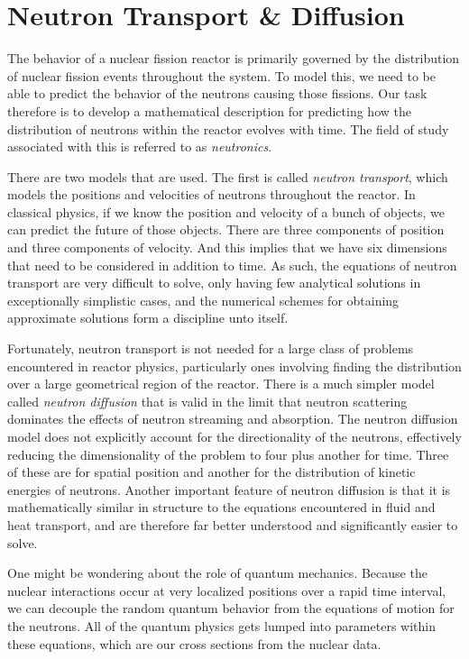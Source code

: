 \chapter{Neutron Transport \& Diffusion}

The behavior of a nuclear fission reactor is primarily governed by the distribution of nuclear fission events throughout the system. To model this, we need to be able to predict the behavior of the neutrons causing those fissions. Our task therefore is to develop a mathematical description for predicting how the distribution of neutrons within the reactor evolves with time. The field of study associated with this is referred to as \emph{neutronics}. 

There are two models that are used. The first is called \emph{neutron transport}, which models the positions and velocities of neutrons throughout the reactor. In classical physics, if we know the position and velocity of a bunch of objects, we can predict the future of those objects. There are three components of position and three components of velocity. And this implies that we have six dimensions that need to be considered in addition to time. As such, the equations of neutron transport are very difficult to solve, only having few analytical solutions in exceptionally simplistic cases, and the numerical schemes for obtaining approximate solutions form a discipline unto itself. 

Fortunately, neutron transport is not needed for a large class of problems encountered in reactor physics, particularly ones involving finding the distribution over a large geometrical region of the reactor. There is a much simpler model called \emph{neutron diffusion} that is valid in the limit that neutron scattering dominates the effects of neutron streaming and absorption. The neutron diffusion model does not explicitly account for the directionality of the neutrons, effectively reducing the dimensionality of the problem to four plus another for time. Three of these are for spatial position and another for the distribution of kinetic energies of neutrons. Another important feature of neutron diffusion is that it is mathematically similar in structure to the equations encountered in fluid and heat transport, and are therefore far better understood and significantly easier to solve.

One might be wondering about the role of quantum mechanics. Because the nuclear interactions occur at very localized positions over a rapid time interval, we can decouple the random quantum behavior from the equations of motion for the neutrons. All of the quantum physics gets lumped into parameters within these equations, which are our cross sections from the nuclear data.

